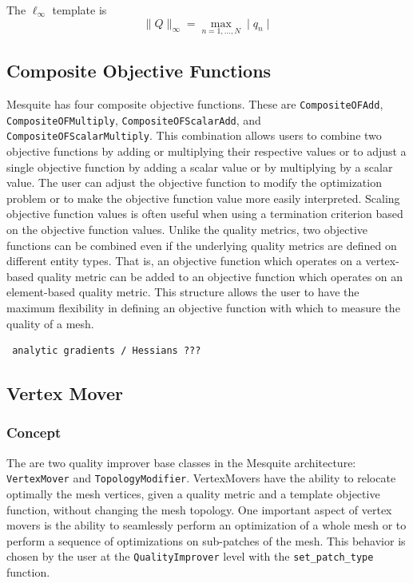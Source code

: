  \newline
The $\ell_{\infty}$ template is
\begin{equation}
\| Q \|_{\infty} = \max_{n=1,\ldots,N} \mid q_n \mid
\end{equation}


\subsection{Composite Objective Functions}

Mesquite has four composite objective functions.  These are
\texttt{CompositeOFAdd}, \texttt{CompositeOFMultiply}, \texttt{CompositeOFScalarAdd}, and
\texttt{CompositeOFScalarMultiply}.  This combination allows users
to combine two objective functions by adding or multiplying
their respective values or to adjust a single objective function
by adding a scalar value or by multiplying by a scalar value.  
The user can adjust the objective function to modify the
optimization problem or to make the objective function value
more easily interpreted.  Scaling objective function values
is often useful when using a termination criterion based on the
objective function values. Unlike the quality metrics, 
two objective functions can be combined
even if the underlying quality metrics are defined on different entity
types.  That is, an objective function which operates on a vertex-based
quality metric can be added to an objective function which operates
on an element-based quality metric.  This structure allows the user
to have the maximum flexibility in defining an objective function with
which to measure the quality of a mesh.

\begin{verbatim} analytic gradients / Hessians ??? \end{verbatim} 

\subsection{Vertex Mover} \label{sec:VertexMover}

\subsubsection{Concept}
The are two quality improver base classes in the Mesquite architecture: \texttt{VertexMover} and
\texttt{TopologyModifier}. VertexMovers have the ability to relocate optimally the mesh vertices,
given a quality metric and a template objective function, without changing the mesh topology.
One important aspect of vertex movers is
the ability to seamlessly perform an optimization of a whole mesh or
to perform a sequence of optimizations on sub-patches of the mesh.
This behavior is chosen by the user at the \texttt{QualityImprover}
level with the \texttt{set\_patch\_type} function. 


